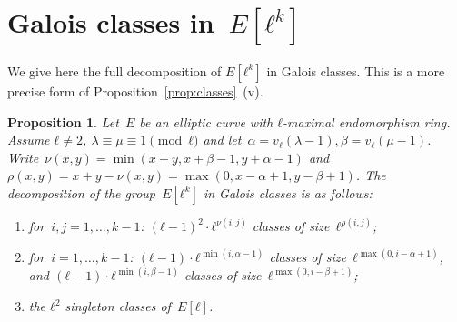 \documentclass{lms}
\newcommand{\todo}[1]{{\color{red}TODO: #1}}
\newtheorem{prop}[thm]{Proposition}
\begin{document}




\appendix

\section{Galois classes in~$E[ℓ^k]$}
\label{ap:galois}

We give here the full decomposition of $E[ℓ^k]$ in Galois classes.
This is a more precise form of Proposition~\ref{prop:classes}~(v).
\begin{prop}\label{prop:orbites-l-torsion}
Let~$E$ be an elliptic curve with $ℓ$-maximal endomorphism ring.
Assume $ℓ ≠ 2$, $λ ≡ μ ≡ 1 \pmod{ℓ}$ and let~$α = v_ℓ(λ-1), β=v_ℓ(μ-1)$.
Write~$ν(x, y) = \min (x+y, x+β-1, y+α-1)$
and~$ρ(x, y) = x+y - ν(x, y) = \max (0, x-α+1, y-β+1)$.
The decomposition of the group~$E[ℓ^k]$ in Galois classes is as follows:
\begin{enumerate}
\item for~$i, j = 1, …, k-1$:
$(ℓ-1)^2 · ℓ^{ν(i,j)}$ classes of size~$ℓ^{ρ(i,j)}$;
\item for~$i = 1, …, k-1$:
$(ℓ-1) · ℓ^{\min (i, α-1)}$ classes of size~$ℓ^{\max (0, i-α+1)}$, and
$(ℓ-1) · ℓ^{\min (i, β-1)}$ classes of size~$ℓ^{\max (0, i-β+1)}$;
\item the $ℓ^2$ singleton classes of~$E[ℓ]$.
\end{enumerate}
\end{prop}
\end{document}

